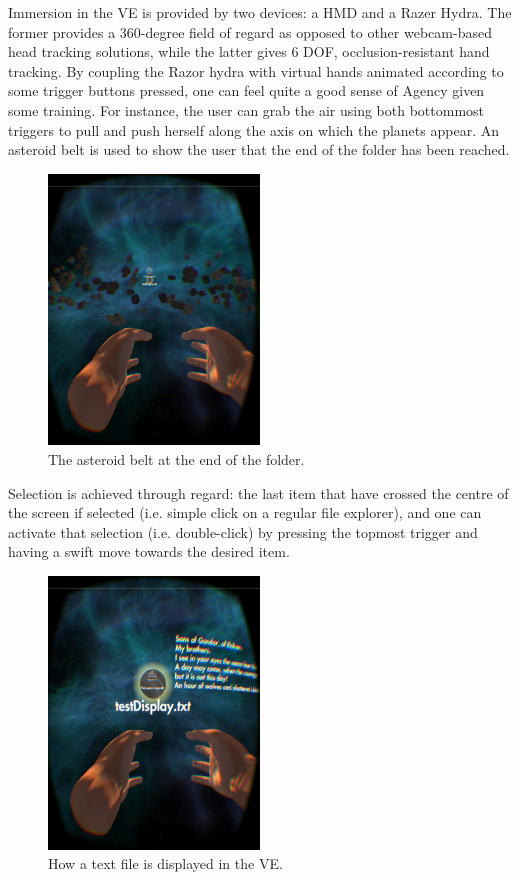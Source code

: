 \documentclass[paper=a4, fontsize=11pt]{scrartcl} %
\numberwithin{equation}{section} %
\numberwithin{figure}{section} %
\numberwithin{table}{section} %
\begin{document}
Immersion in the VE is provided by two devices: a HMD and a Razer Hydra. The former provides a 360-degree field of regard as opposed to other webcam-based head tracking solutions, while the latter gives 6 DOF, occlusion-resistant hand tracking. By coupling the Razor hydra with virtual hands animated according to some trigger buttons pressed, one can feel quite a good sense of Agency given some training. For instance, the user can grab the air using both bottommost triggers to pull and push herself along the axis on which the planets appear. An asteroid belt is used to show the user that the end of the folder has been reached.

\begin{figure}[H]
	\centering
	\includegraphics[width=0.5\textwidth]{asteroids}
	\caption{The asteroid belt at the end of the folder.}
	\label{fig:asteroids}
\end{figure}

Selection is achieved through regard: the last item that have crossed the centre of the screen if selected (i.e. simple click on a regular file explorer), and one can activate that selection (i.e. double-click) by pressing the topmost trigger and having a swift move towards the desired item.

\begin{figure}[H]
	\centering
	\includegraphics[width=0.5\textwidth]{text-display}
	\caption{How a text file is displayed in the VE.}
	\label{fig:textfile}
\end{figure}
\end{document}
